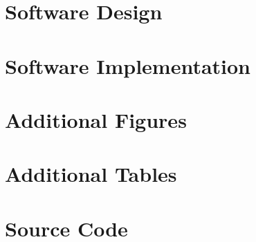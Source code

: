\documentclass[12pt]{report}
\begin{document}
\printbibliography[heading=bibintoc,title={Sources of Information}]
\appendix

\chapter{Software Design}

\chapter{Software Implementation}

\titlespacing*{\chapter}{0pt}{-70pt}{30pt}
\chapter{Additional Figures}

\titlespacing*{\chapter}{0pt}{-10pt}{30pt}
\chapter{Additional Tables}

\chapter{Source Code}

\end{document}
